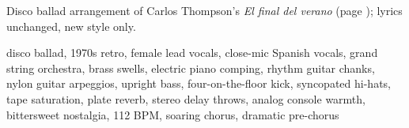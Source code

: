 
\begin{notes}
Disco ballad arrangement of Carlos Thompson's \emph{El final del verano} (page \pageref{sec:verano}); lyrics unchanged, new style only.
\end{notes}
\begin{style}
disco ballad, 1970s retro, female lead vocals, close-mic Spanish vocals, grand string orchestra, brass swells, electric piano comping, rhythm guitar chanks, nylon guitar arpeggios, upright bass, four-on-the-floor kick, syncopated hi-hats, tape saturation, plate reverb, stereo delay throws, analog console warmth, bittersweet nostalgia, 112 BPM, soaring chorus, dramatic pre-chorus
\end{style}
